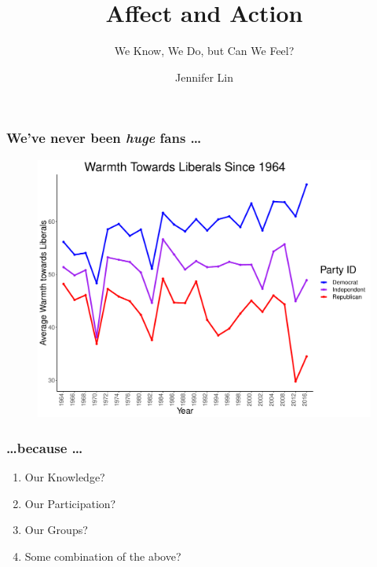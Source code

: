 \documentclass[14pt]{beamer}
\newcommand\e{\emph}
\begin{document}
	\author{Jennifer Lin}
	\title{Affect and Action}
	\subtitle{We Know, We Do, but Can We Feel?}
	\begin{frame}[plain]
	\maketitle
\end{frame}



\begin{frame}
\frametitle{We've never been \e{huge} fans \ldots}
\begin{center}
	\begin{figure}[ht!]  
		{	 \includegraphics[width=.8\textwidth]{Liberals}}
	\end{figure}
\end{center}
\end{frame}

\begin{frame}
\frametitle{\ldots because \ldots}
\begin{enumerate}
	\item Our Knowledge?
	\item Our Participation?
	\item Our Groups?
	\item Some combination of the above?
\end{enumerate}
\end{frame}
\end{document}
